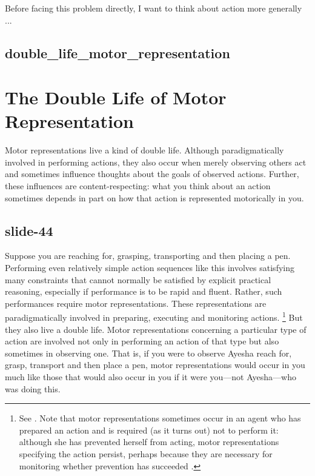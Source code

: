 \documentclass[12pt,\papersize]{extarticle}
\begin{document}
Before facing this problem directly, I want to think about action more generally ...

\subsection{double\_life\_motor\_representation}


\section{The Double Life of Motor Representation}

Motor representations live a kind of double life. Although paradigmatically involved in performing
actions, they also occur when merely observing others act and sometimes influence thoughts about the
goals of observed actions. Further, these influences are content-respecting: what you think about an
action sometimes depends in part on how that action is represented motorically in you.

\subsection{slide-44}
Suppose you are reaching for, grasping, transporting and then placing a pen. Performing even
relatively simple action sequences like this involves satisfying many constraints that cannot
normally be satisfied by explicit practical reasoning, especially if performance is to be rapid and
fluent. Rather, such performances require motor representations.
These representations are paradigmatically involved in preparing, executing and monitoring actions.%
\footnote{%
See \citet{wolpert:1995internal, miall:1996_forward, jeannerod:1998nbo, zhang:2007_planning}.
Note that motor representations sometimes occur in an agent who has prepared an action and is required (as it turns out) not to perform it: although she has prevented herself from acting, motor representations specifying the action persist, perhaps because they are necessary for monitoring whether prevention has succeeded \citep{bonini:2014_ventral}.
}
But they also live a double life. Motor representations concerning a particular type of action are
involved not only in performing an action of that type but also sometimes in observing one. That is,
if you were to observe Ayesha reach for, grasp, transport and then place a pen, motor representations
would occur in you much like those that would also occur in you if it were you---not Ayesha---who was
doing this.
\end{document}
